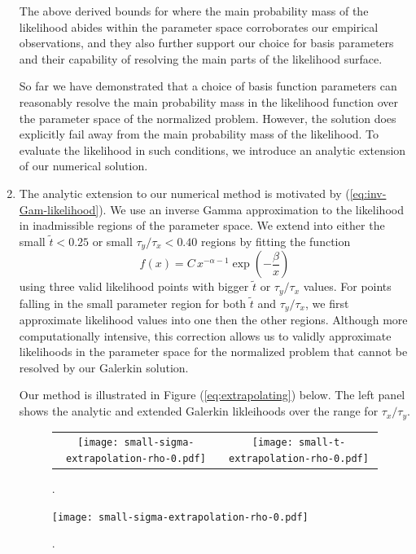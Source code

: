 \documentclass[10pt]{article}
\begin{document}
\begin{enumerate}
      The above derived bounds for where the main probability mass of
      the likelihood abides within the parameter space corroborates
      our empirical observations, and they also further support our
      choice for basis parameters and their capability of resolving
      the main parts of the likelihood surface.

      So far we have demonstrated that a choice of basis function
      parameters can reasonably resolve the main probability mass in
      the likelihood function over the parameter space of the
      normalized problem. However, the solution does explicitly fail
      away from the main probability mass of the likelihood. To
      evaluate the likelihood in such conditions, we introduce an
      analytic extension of our numerical solution.

    \item The analytic extension to our numerical method is motivated
      by (\ref{eq:inv-Gam-likelihood}). We use an inverse Gamma
      approximation to the likelihood in inadmissible regions of the
      parameter space. We extend into either the small $\tilde{t} < 0.25$ or
      small $\tau_y/\tau_x < 0.40$ regions by fitting the function
      \[
        f(x) = C\, x^{-\alpha-1} \exp\left( -\frac{\beta}{x} \right)
      \]
      using three valid likelihood points with bigger $\tilde{t}$ or
      $\tau_y/\tau_x$ values. For points falling in the small
      parameter region for both $\tilde{t}$ and $\tau_y/\tau_x$, we
      first approximate likelihood values into one then the other
      regions. Although more computationally intensive, this
      correction allows us to validly approximate likelihoods in the
      parameter space for the normalized problem that cannot be
      resolved by our Galerkin solution.

      Our method is illustrated in Figure (\ref{eq:extrapolating})
      below. The left panel shows the analytic and extended Galerkin
      likleihoods over the range for $\tau_x/\tau_y$.

      \begin{figure}
  \centering
  \begin{tabular}{cc}
    \begin{minipage}{0.45\textwidth}
      \centering
      \texttt{[image: small-sigma-extrapolation-rho-0.pdf]}
    \end{minipage}
    & \begin{minipage}{0.45\textwidth}
      \centering
      \texttt{[image: small-t-extrapolation-rho-0.pdf]}
    \end{minipage}
  \end{tabular}
  \caption{.}
  \label{fig:extrapolation}
\end{figure}
      \begin{figure}
        \centering
        \texttt{[image: small-sigma-extrapolation-rho-0.pdf]}
        \caption{.}
        \label{fig:extrapolation}
      \end{figure}
      
    \end{enumerate}
\end{document}
